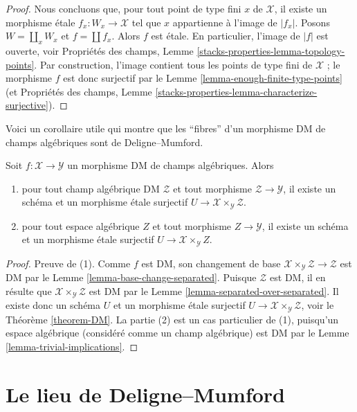 \begin{proof}
\medskip\noindent
Nous concluons que, pour tout point de type fini $x$ de $\mathcal{X}$, il
existe un morphisme étale $f_x : W_x \to \mathcal{X}$ tel que $x$ appartienne
à l'image de $|f_x|$. Posons $W = \coprod_x W_x$ et $f = \coprod f_x$.
Alors $f$ est étale. En particulier, l'image de $|f|$ est ouverte, voir
Propriétés des champs, Lemme \ref{stacks-properties-lemma-topology-points}.
Par construction, l'image contient tous les points de type fini de
$\mathcal{X}$ ; le morphisme $f$ est donc surjectif par le
Lemme \ref{lemma-enough-finite-type-points} (et Propriétés des champs,
Lemme \ref{stacks-properties-lemma-characterize-surjective}).
\end{proof}

\noindent
Voici un corollaire utile qui montre que les ``fibres'' d'un morphisme DM
de champs algébriques sont de Deligne--Mumford.

\begin{lemma}
\label{lemma-DM}
Soit $f : \mathcal{X} \to \mathcal{Y}$ un morphisme DM de champs
algébriques. Alors
\begin{enumerate}
\item pour tout champ algébrique DM $\mathcal{Z}$ et tout morphisme
$\mathcal{Z} \to \mathcal{Y}$, il existe un schéma et un morphisme
étale surjectif
$U \to \mathcal{X} \times_\mathcal{Y} \mathcal{Z}$.
\item pour tout espace algébrique $Z$ et tout morphisme
$Z \to \mathcal{Y}$, il existe un schéma et un morphisme
étale surjectif
$U \to \mathcal{X} \times_\mathcal{Y} Z$.
\end{enumerate}
\end{lemma}

\begin{proof}
Preuve de (1). Comme $f$ est DM, son changement de base
$\mathcal{X} \times_\mathcal{Y} \mathcal{Z} \to \mathcal{Z}$ est DM
par le Lemme \ref{lemma-base-change-separated}.
Puisque $\mathcal{Z}$ est DM, il en résulte que
$\mathcal{X} \times_\mathcal{Y} \mathcal{Z}$ est DM
par le Lemme \ref{lemma-separated-over-separated}. Il existe donc un
schéma $U$ et un morphisme étale surjectif
$U \to \mathcal{X} \times_\mathcal{Y} \mathcal{Z}$, voir le
Théorème \ref{theorem-DM}.
La partie (2) est un cas particulier de (1), puisqu'un espace algébrique
(considéré comme un champ algébrique) est DM par le
Lemme \ref{lemma-trivial-implications}.
\end{proof}






\section{Le lieu de Deligne--Mumford}
\label{section-DM}

